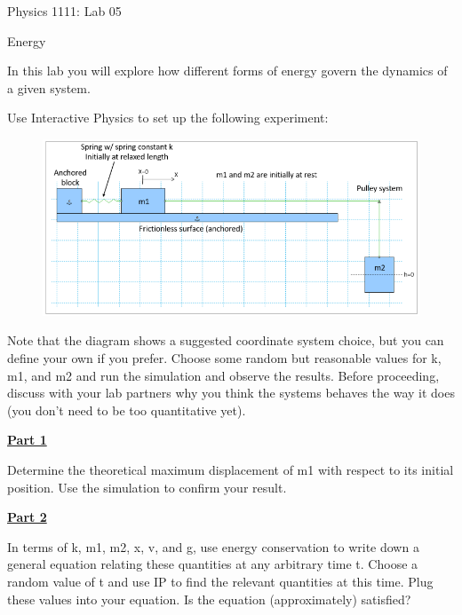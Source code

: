 \documentclass[12pt]{article}
\begin{document}
{\centering
\large Physics 1111: Lab 05 \par
\large Energy \par
}
\hfill \break \vspace{-4mm}

In this lab you will explore how different forms of energy govern the dynamics of a given system.

Use Interactive Physics to set up the following experiment:
%
\begin{figure}[H]
\includegraphics[scale=0.70]{figures/fig1.png}
\end{figure}
%
Note that the diagram shows a suggested coordinate system choice, but you can define your own if you prefer.
Choose some random but reasonable values for k, m1, and m2 and run the simulation and observe the results.
Before proceeding, discuss with your lab partners why you think the systems behaves the way it does (you don't need to be too quantitative yet).

\underline{\textbf{Part 1}} \par
Determine the theoretical maximum displacement of m1 with respect to its initial position.
Use the simulation to confirm your result.

\underline{\textbf{Part 2}} \par
In terms of k, m1, m2, x, v, and g, use energy conservation to write down a general equation relating these quantities at any arbitrary time t.
Choose a random value of t and use IP to find the relevant quantities at this time.
Plug these values into your equation.
Is the equation (approximately) satisfied?
\end{document}
